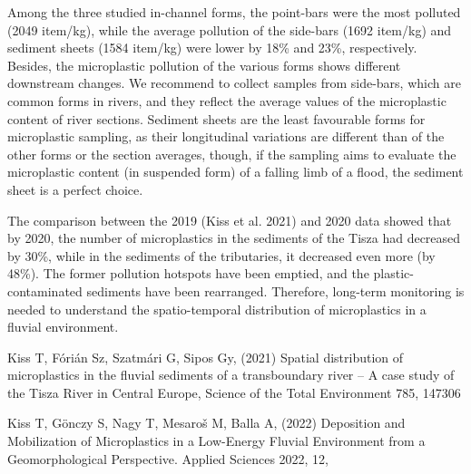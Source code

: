 {Among the three studied in-channel forms, the point-bars were the most polluted (2049 item/kg), while the average pollution of the side-bars (1692 item/kg) and sediment sheets (1584 item/kg) were lower by 18\% and 23\%, respectively. Besides, the microplastic pollution of the various forms shows different downstream changes. We recommend to collect samples from side-bars, which are common forms in rivers, and they reflect the average values of the microplastic content of river sections. Sediment sheets are the least favourable forms for microplastic sampling, as their longitudinal variations are different than of the other forms or the section averages, though, if the sampling aims to evaluate the microplastic content (in suspended form) of a falling limb of a flood, the sediment sheet is a perfect choice.

The comparison between the 2019 (Kiss et al. 2021) and 2020 data showed that by 2020, the number of microplastics in the sediments of the Tisza had decreased by 30\%, while in the sediments of the tributaries, it decreased even more (by 48\%). The former pollution hotspots have been emptied, and the plastic-contaminated sediments have been rearranged. Therefore, long-term monitoring is needed to understand the spatio-temporal distribution of microplastics in a fluvial environment.
}
{Kiss T, Fórián Sz, Szatmári G, Sipos Gy, (2021) Spatial distribution of microplastics in the fluvial sediments of a transboundary river – A case study of the Tisza River in Central Europe, Science of the Total Environment 785, 147306

Kiss T, Gönczy S, Nagy T, Mesaroš M, Balla A, (2022) Deposition and Mobilization of Microplastics in a Low-Energy Fluvial Environment from a Geomorphological Perspective. Applied Sciences 2022, 12, 
}

